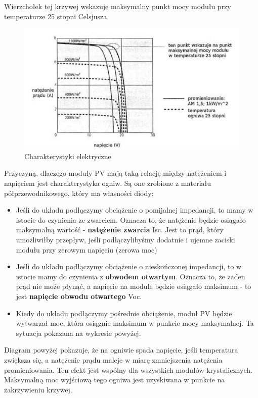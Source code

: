 \documentclass[12pt,a4paper]{article}
\begin{document}
Wierzchołek tej krzywej wskazuje maksymalny punkt mocy modułu przy 
temperaturze 25 stopni Celsjusza. 

\begin{figure}[H]
\centering
\caption{Charakterystyki elektryczne}
\includegraphics[natwidth=13.05cm,natheight=7.35cm]{media/image10.jpg}
\end{figure}
 
Przyczyną, dlaczego moduły PV mają taką relację między natężeniem i 
napięciem jest charakterystyka ogniw. Są one zrobione z materiału 
półprzewodnikowego, który ma własności diody: 

\begin{itemize}
\item Jeśli do układu podłączymy obciążenie o pomijalnej impedancji, to 
mamy w istocie do czynienia ze zwarciem. Oznacza to, że natężenie będzie 
osiągało maksymalną wartość - \textbf{natężenie zwarcia} Isc. Jest to prąd, który 
umożliwiłby przepływ, jeśli podłączylibyśmy dodatnie i ujemne zaciski 
modułu przy zerowym napięciu (zerowa moc) 
\item Jeśli do układu podłączymy obciążenie o nieskończonej impedancji, 
to w istocie mamy do czynienia z \textbf{obwodem otwartym}. Oznacza to, że żaden 
prąd nie może płynąć, a napięcie na module będzie osiągało maksimum - to 
jest \textbf{napięcie obwodu otwartego} Voc. 
\item Kiedy do układu podłączymy pośrednie obciążenie, moduł PV będzie 
wytwarzał moc, która osiągnie maksimum w punkcie mocy maksymalnej. Ta 
sytuacja pokazana na wykresie powyżej. 
\end{itemize}
 
Diagram powyżej pokazuje, że na ogniwie spada napięcie, jeśli 
temperatura zwiększa się, a natężenie prądu maleje w miarę zmniejszenia 
natężenia promieniowania. Ten efekt jest wspólny dla wszystkich modułów 
krystalicznych. Maksymalną moc wyjściową tego ogniwa jest uzyskiwana w 
punkcie na zakrzywieniu krzywej. 
\end{document}
